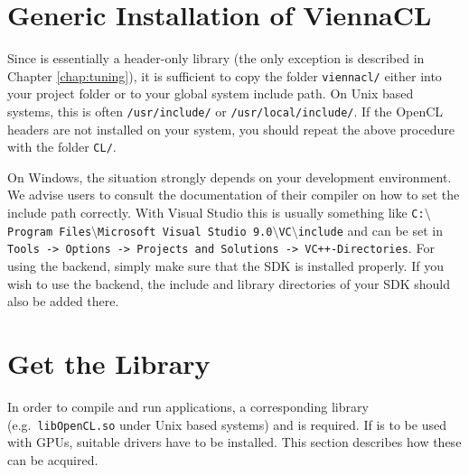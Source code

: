 
\section{Generic Installation of ViennaCL} \label{sec:viennacl-installation}
Since {\ViennaCL} is essentially a header-only library (the only exception is
described in Chapter \ref{chap:tuning}), it is sufficient to copy the folder
\lstinline|viennacl/| either into your project folder or to your global system
include path. On Unix based systems, this is often \lstinline|/usr/include/| or
\lstinline|/usr/local/include/|. If the OpenCL headers are not installed on your system,
you should repeat the above procedure with the folder \lstinline|CL/|.

On Windows, the situation strongly depends on your development environment. We advise users
to consult the documentation of their compiler on how to set the include path correctly.
With Visual Studio this is usually something like \texttt{C:$\setminus$Program Files$\setminus$Microsoft Visual Studio 9.0$\setminus$VC$\setminus$include}
and can be set in \texttt{Tools -> Options -> Projects and Solutions -> VC++-\-Directories}.
For using the {\CUDA} backend, simply make sure that the {\CUDA} SDK is installed properly.
If you wish to use the {\OpenCL} backend, the include and library directories of your {\OpenCL} SDK should also be added there.



\section{Get the {\OpenCL} Library}
\label{opencllibs}
In order to compile and run {\OpenCL} applications, a corresponding library
(e.g.~\texttt{libOpenCL.so} under Unix based systems) and is required.
If {\OpenCL} is to be used with GPUs, suitable drivers have to be installed. This section describes how these can be acquired.

